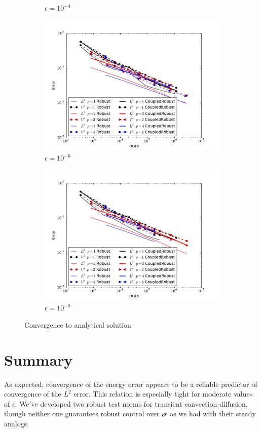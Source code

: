 \documentclass[Dissertation.tex]{subfiles}
\begin{document}
\begin{figure}[ht]
\begin{subfigure}[t]{0.45\textwidth}
\caption{$\epsilon=10^{-4}$}
\end{subfigure}
\begin{subfigure}[t]{0.45\textwidth}
\centering
\includegraphics[width=\textwidth]{Confusion/Robustness/convergence_epsilon=1e-6.pdf}
\caption{$\epsilon=10^{-6}$}
\end{subfigure}
\begin{subfigure}[t]{0.45\textwidth}
\centering
\includegraphics[width=\textwidth]{Confusion/Robustness/convergence_epsilon=1e-8.pdf}
\caption{$\epsilon=10^{-8}$}
\end{subfigure}
\caption{Convergence to analytical solution}
\label{fig:robustConvergence}
\end{figure}

\section{Summary}
As expected, convergence of the energy error appears to be a reliable predictor of convergence of the $L^2$ error. 
This relation is especially tight for moderate values of $\epsilon$. 
We've developed two robust test norms for transient convection-diffusion, though neither one guarantees robust control over $\boldsymbol\sigma$ as we had
with their steady analogs. 

\end{document}
